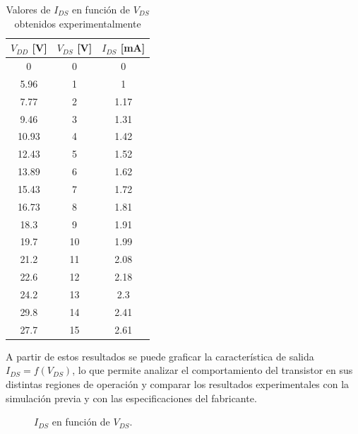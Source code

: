     \begin{table}[H]
      \centering
      \begin{tabular}{|c|c|c|}
        \hline
        \textbf{$V_{DD}$ [V]}  &  \textbf{ $V_{DS}$ [V]} & \textbf{$I_{DS}$ [mA]} \\ \hline
        0      &    0   & 0     \\ \hline
        5.96   &    1   & 1     \\ \hline
        7.77   &    2   & 1.17  \\ \hline
        9.46   &    3   & 1.31  \\ \hline
        10.93  &    4   & 1.42  \\ \hline
        12.43  &    5   & 1.52  \\ \hline
        13.89  &    6   & 1.62  \\ \hline
        15.43  &    7   & 1.72  \\ \hline
        16.73  &    8   & 1.81  \\ \hline
        18.3   &    9   & 1.91  \\ \hline
        19.7   &    10  & 1.99  \\ \hline
        21.2   &    11  & 2.08  \\ \hline
        22.6   &    12  & 2.18  \\ \hline
        24.2   &    13  & 2.3   \\ \hline
        29.8   &    14  & 2.41  \\ \hline
        27.7   &    15  & 2.61  \\ \hline
      \end{tabular}
      \caption{Valores de $I_{DS}$ en función de $V_{DS}$ obtenidos experimentalmente}
      \label{tab:ids-vds}
    \end{table}
    
    A partir de estos resultados se puede graficar la característica de salida $I_{DS} = f(V_{DS})$, 
    lo que permite analizar el comportamiento del transistor en sus distintas regiones de operación 
    y comparar los resultados experimentales con la simulación previa y con las especificaciones del fabricante.

    \begin{figure}[H]
      \centering
      \caption{$I_{DS}$ en función de $V_{DS}$.}
    \end{figure}

